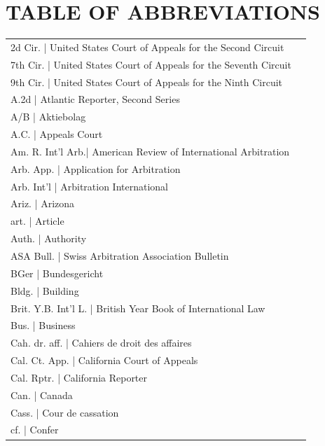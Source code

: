 \section{TABLE OF ABBREVIATIONS}
\vspace{8pt}
\begin{longtable}[l]{p{1.3in}p{5.1in}}
2d Cir.     | United States Court of Appeals for the Second Circuit \\
7th Cir.    | United States Court of Appeals for the Seventh Circuit \\
9th Cir.    | United States Court of Appeals for the Ninth Circuit \\
A.2d        | Atlantic Reporter, Second Series \\
A/B         | Aktiebolag \\
A.C.        | Appeals Court \\
Am. R. Int'l Arb.| American Review of International Arbitration\\
Arb. App.   | Application for Arbitration \\
Arb. Int'l  | Arbitration International \\
Ariz.       | Arizona \\
art.        | Article \\
Auth.       | Authority \\
ASA Bull.   | Swiss Arbitration Association Bulletin \\
BGer        | Bundesgericht  \\
Bldg.       | Building \\
Brit. Y.B. Int'l L. | British Year Book of International Law \\
Bus.        | Business \\
Cah. dr. aff. | Cahiers de droit des affaires \\
Cal. Ct. App. | California Court of Appeals \\
Cal. Rptr.  | California Reporter \\
Can.        | Canada \\
Cass.       | Cour de cassation \\
cf.         | Confer \\

\end{longtable}
